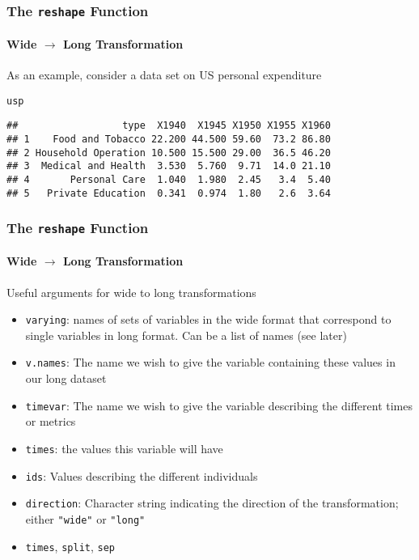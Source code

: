 \documentclass[paper=screen,mathserif]{beamer}\usepackage[]{graphicx}\usepackage[]{color}
\makeatletter
\newcommand{\hlstd}[1]{\textcolor[rgb]{0.345,0.345,0.345}{#1}}%
\newenvironment{kframe}{%
 \def\at@end@of@kframe{}%
 \ifinner\ifhmode%
  \def\at@end@of@kframe{\end{minipage}}%
  \begin{minipage}{\columnwidth}%
 \fi\fi%
 \def\FrameCommand##1{\hskip\@totalleftmargin \hskip-\fboxsep
 \colorbox{shadecolor}{##1}\hskip-\fboxsep
     \hskip-\linewidth \hskip-\@totalleftmargin \hskip\columnwidth}%
 \MakeFramed {\advance\hsize-\width
   \@totalleftmargin\z@ \linewidth\hsize
   \@setminipage}}%
 {\par\unskip\endMakeFramed%
 \at@end@of@kframe}
\newenvironment{knitrout}{}{} %
\newcommand{\ft}[1]{\frametitle{#1}}
\newcommand{\fst}[1]{\framesubtitle{#1}}
\makeatother
\begin{document}
\begin{frame}[fragile]
  \ft{The {\tt reshape} Function}
  \fst{Wide $\rightarrow$ Long Transformation}
  


As an example, consider a data set on US personal expenditure
\begin{knitrout}\scriptsize
{}\color{fgcolor}\begin{kframe}
\begin{alltt}
\hlstd{usp}
\end{alltt}
\begin{verbatim}
##                  type  X1940  X1945 X1950 X1955 X1960
## 1    Food and Tobacco 22.200 44.500 59.60  73.2 86.80
## 2 Household Operation 10.500 15.500 29.00  36.5 46.20
## 3  Medical and Health  3.530  5.760  9.71  14.0 21.10
## 4       Personal Care  1.040  1.980  2.45   3.4  5.40
## 5   Private Education  0.341  0.974  1.80   2.6  3.64
\end{verbatim}
\end{kframe}
\end{knitrout}
 
\end{frame}

\begin{frame}[fragile]
  \ft{The {\tt reshape} Function}
  \fst{Wide $\rightarrow$ Long Transformation}
  Useful arguments for wide to long transformations
  \begin{itemize}
  \item \verb=varying=: names of sets of variables in the wide format
    that correspond to single variables in long format. Can be a list
    of names (see later)
  \item \verb=v.names=: The name we wish to give the variable
    containing these values in our long dataset
  \item \verb=timevar=: The name we wish to give the variable
    describing the different times or metrics
  \item \verb=times=: the values this variable will have
  \item \verb=ids=: Values describing the different individuals
  \item \verb=direction=: Character string indicating the direction of
    the transformation; either \verb="wide"= or \verb="long"=
  \item \verb=times=, \verb=split=, \verb=sep=
  \end{itemize}
\end{frame}
\end{document}
